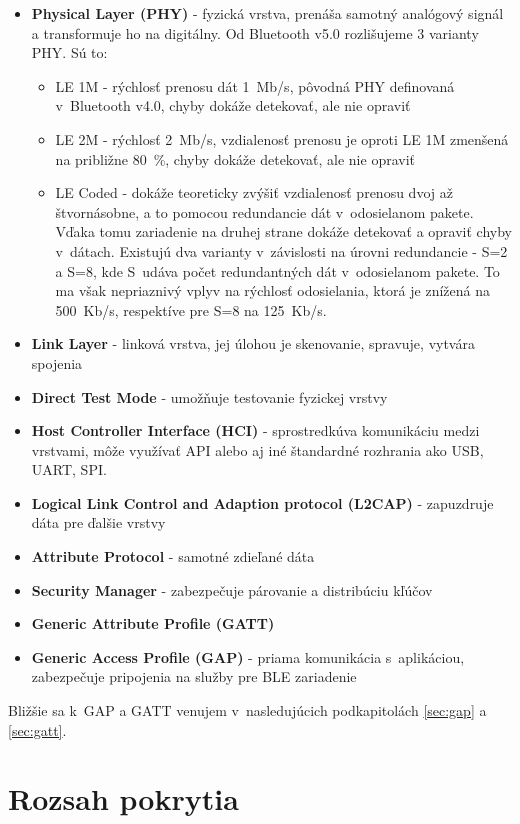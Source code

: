 \begin{itemize}
    \item \textbf{Physical Layer (PHY)} - fyzická vrstva, prenáša samotný analógový signál a transformuje ho na digitálny. Od Bluetooth v5.0 rozlišujeme 3 varianty PHY. Sú to:
    \begin{itemize}
        \item LE 1M - rýchlosť prenosu dát 1~Mb/s, pôvodná PHY definovaná v~Bluetooth v4.0, chyby dokáže detekovať, ale nie opraviť
        \item LE 2M - rýchlosť 2~Mb/s, vzdialenosť prenosu je oproti LE 1M zmenšená na približne 80~\%, chyby dokáže detekovať, ale nie opraviť
        \item LE Coded - dokáže teoreticky zvýšiť vzdialenosť prenosu dvoj až štvornásobne, a to pomocou redundancie dát v~odosielanom pakete. Vďaka tomu zariadenie na druhej strane dokáže detekovať a opraviť chyby v~dátach. Existujú dva varianty v~závislosti na úrovni redundancie - S=2 a S=8, kde S~udáva počet redundantných dát v~odosielanom pakete. To ma však nepriaznivý vplyv na rýchlosť odosielania, ktorá je znížená na 500~Kb/s, respektíve pre S=8 na 125~Kb/s. 
    \end{itemize}
    \item \textbf{Link Layer} - linková vrstva, jej úlohou je skenovanie, spravuje, vytvára spojenia
    \item \textbf{Direct Test Mode} - umožňuje testovanie fyzickej vrstvy
    \item \textbf{Host Controller Interface (HCI)} - sprostredkúva komunikáciu medzi vrstvami, môže využívať API alebo aj iné štandardné rozhrania ako USB, UART, SPI. 
    \item \textbf{Logical Link Control and Adaption protocol (L2CAP)} - zapuzdruje dáta pre ďalšie vrstvy
    \item \textbf{Attribute Protocol} - samotné zdieľané dáta
    \item \textbf{Security Manager} - zabezpečuje párovanie a distribúciu kľúčov
    \item \textbf{Generic Attribute Profile (GATT)}
    \item \textbf{Generic Access Profile (GAP)} - priama komunikácia s~aplikáciou, zabezpečuje pripojenia na služby pre BLE zariadenie
    \cite{bluetooth}\cite{ble-arch}
\end{itemize}
Bližšie sa k~GAP a GATT venujem v~nasledujúcich podkapitolách \ref{sec:gap} a \ref{sec:gatt}.

\section{Rozsah pokrytia}

